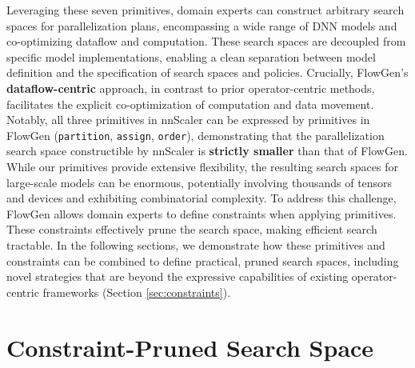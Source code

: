 
Leveraging these seven primitives, domain experts can construct arbitrary search spaces for parallelization plans, encompassing a wide range of DNN models and co-optimizing dataflow and computation. These search spaces are decoupled from specific model implementations, enabling a clean separation between model definition and the specification of search spaces and policies. Crucially, FlowGen's \textbf{dataflow-centric} approach, in contrast to prior operator-centric methods, facilitates the explicit co-optimization of computation and data movement. Notably, all three primitives in nnScaler can be expressed by primitives in FlowGen (\texttt{partition}, \texttt{assign}, \texttt{order}), demonstrating that the parallelization search space constructible by nnScaler is \textbf{strictly smaller} than that of FlowGen. While our primitives provide extensive flexibility, the resulting search spaces for large-scale models can be enormous, potentially involving thousands of tensors and devices and exhibiting combinatorial complexity. To address this challenge, FlowGen allows domain experts to define constraints when applying primitives. These constraints effectively prune the search space, making efficient search tractable. In the following sections, we demonstrate how these primitives and constraints can be combined to define practical, pruned search spaces, including novel strategies that are beyond the expressive capabilities of existing operator-centric frameworks (Section \ref{sec:constraints}).


\section{Constraint-Pruned Search Space}
\label{sec:new_strategies}

